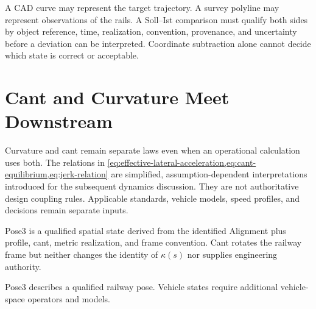 A CAD curve may represent the target trajectory. A survey polyline may
represent observations of the rails. A Soll--Ist comparison must qualify both
sides by object reference, time, realization, convention, provenance, and
uncertainty before a deviation can be interpreted. Coordinate subtraction
alone cannot decide which state is correct or acceptable.

\section{Cant and Curvature Meet Downstream}

Curvature and cant remain separate laws even when an operational calculation
uses both. The relations in
\cref{eq:effective-lateral-acceleration,eq:cant-equilibrium,eq:jerk-relation}
are simplified, assumption-dependent interpretations introduced for the
subsequent dynamics discussion. They are not authoritative design coupling
rules. Applicable standards, vehicle models, speed profiles, and decisions
remain separate inputs.

\begin{summary}
Pose3 is a qualified spatial state derived from the identified Alignment plus
profile, cant, metric realization, and frame convention. Cant rotates the
railway frame but neither changes the identity of \(\kappa(s)\) nor supplies
engineering authority.
\end{summary}

\begin{proposition}
Pose3 describes a qualified railway pose. Vehicle states require additional
vehicle-space operators and models.
\end{proposition}

